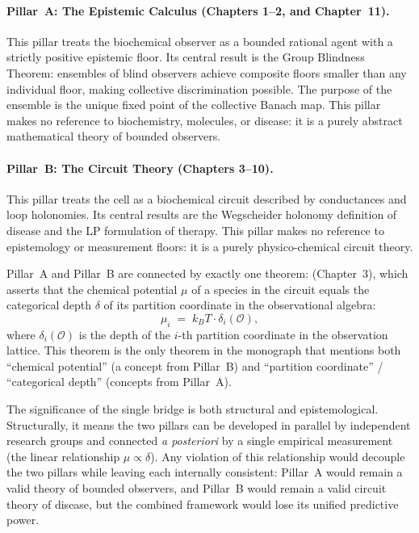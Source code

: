 \paragraph{Pillar~A: The Epistemic Calculus (Chapters 1--2, and Chapter~11).}
This pillar treats the biochemical observer as a bounded rational agent with a
strictly positive epistemic floor.  Its central result is the Group Blindness
Theorem: ensembles of blind observers achieve composite floors smaller than
any individual floor, making collective discrimination possible.  The purpose
of the ensemble is the unique fixed point of the collective Banach map.  This
pillar makes no reference to biochemistry, molecules, or disease: it is a
purely abstract mathematical theory of bounded observers.

\paragraph{Pillar~B: The Circuit Theory (Chapters 3--10).}
This pillar treats the cell as a biochemical circuit described by conductances
and loop holonomies.  Its central results are the Wegscheider holonomy
definition of disease and the LP formulation of therapy.  This pillar makes
no reference to epistemology or measurement floors: it is a purely
physico-chemical circuit theory.

\begin{theorem}
\label{thm:ch11-single-bridge}
Pillar~A and Pillar~B are connected by exactly one theorem:
 (Chapter~3), which asserts that
the chemical potential $\mu$ of a species in the circuit equals the categorical
depth $\delta$ of its partition coordinate in the observational algebra:
\[
  \mu_i \;=\; k_B T \cdot \delta_i(\mathcal{O}),
\]
where $\delta_i(\mathcal{O})$ is the depth of the $i$-th partition coordinate
in the observation lattice.  This theorem is the only theorem in the monograph
that mentions both ``chemical potential'' (a concept from Pillar~B) and
``partition coordinate'' / ``categorical depth'' (concepts from Pillar~A).
\end{theorem}

The significance of the single bridge is both structural and epistemological.
Structurally, it means the two pillars can be developed in parallel by
independent research groups and connected \emph{a posteriori} by a single
empirical measurement (the linear relationship $\mu \propto \delta$).  Any
violation of this relationship would decouple the two pillars while leaving
each internally consistent: Pillar~A would remain a valid theory of bounded
observers, and Pillar~B would remain a valid circuit theory of disease,
but the combined framework would lose its unified predictive power.

